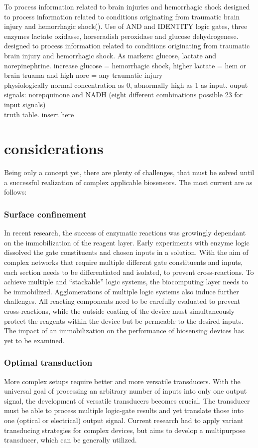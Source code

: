\documentclass[runningheads]{llncs}
\begin{document}
	To process information related to brain injuries and hemorrhagic shock 
	designed to process information related to conditions originating from traumatic brain injury and hemorrhagic shock().
	Use of AND and IDENTITY logic gates, three enzymes lactate oxidasse, horseradish peroxidase and glucose dehydrogenese. designed to process information related to conditions originating from traumatic brain injury and hemorrhagic shock.
	As markers: glucose, lactate and norepinephrine.
	increase glucose = hemorrhagic shock, higher lactate = hem or brain truama and high nore = any traumatic injury \\
	physiologically normal concentration as 0, abnormally high as 1 as input.
	ouput signals: norepquinone and NADH (eight different combinations possible 23 for input signals)\\
	truth table. insert here 
	
	
	
	



\section{considerations} 
Being only a concept yet, there are plenty of challenges, that must be solved until a successful realization of complex applicable biosensors. The most current are as follows:
\subsubsection{Surface confinement}	In recent research, the success of enzymatic reactions was growingly dependant on the immobilization of the reagent layer. Early experiments with enzyme logic dissolved the gate constituents and chosen inputs in a solution. With the aim of complex networks that require multiple different gate constituents and inputs, each section needs to be differentiated and isolated, to prevent cross-reactions. To achieve multiple and “stackable” logic systems, the biocomputing layer needs to be immobilized. Agglomerations of multiple logic systems also induce further challenges. All reacting components need to be carefully evaluated to prevent cross-reactions, while the outside coating of the device must simultaneously protect the reagents within the device but be permeable to the desired inputs. The impact of an immobilization on the performance of biosensing devices has yet to be examined.\\

\subsubsection{Optimal transduction}	More complex setups require better and more versatile transducers. With the universal goal of processing an arbitrary number of inputs into only one output signal, the development of versatile transducers becomes crucial. The transducer must be able to process multiple logic-gate results and yet translate those into one (optical or electrical) output signal. Current research had to apply variant transducing strategies for complex devices, but aims to develop a multipurpose transducer, which can be generally utilized.\\
\end{document}
